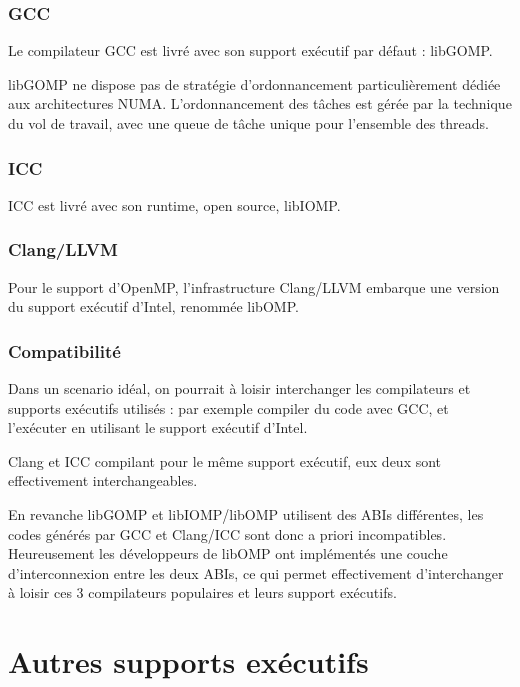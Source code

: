 \subsubsection{GCC}

Le compilateur GCC est livré avec son support exécutif par défaut : libGOMP.

libGOMP ne dispose pas de stratégie d'ordonnancement particulièrement dédiée aux architectures NUMA.
L'ordonnancement des tâches est gérée par la technique du vol de travail, avec une queue de tâche unique pour l'ensemble des threads.



\subsubsection{ICC}

ICC est livré avec son runtime, open source, libIOMP.


\subsubsection{Clang/LLVM}

Pour le support d'OpenMP, l'infrastructure Clang/LLVM embarque une version du support exécutif d'Intel, renommée libOMP.

\subsubsection{Compatibilité}

Dans un scenario idéal, on pourrait à loisir interchanger les compilateurs et supports exécutifs utilisés : par exemple compiler du code avec GCC, et l'exécuter en utilisant le support exécutif d'Intel.

Clang et ICC compilant pour le même support exécutif, eux deux sont effectivement interchangeables.

En revanche libGOMP et libIOMP/libOMP utilisent des ABIs différentes, les codes générés par GCC et Clang/ICC sont donc a priori incompatibles.
Heureusement les développeurs de libOMP ont implémentés une couche d'interconnexion entre les deux ABIs, ce qui permet effectivement d'interchanger à loisir ces 3 compilateurs populaires et leurs support exécutifs.

\section{Autres supports exécutifs}\label{sec:rw:runtimes}

